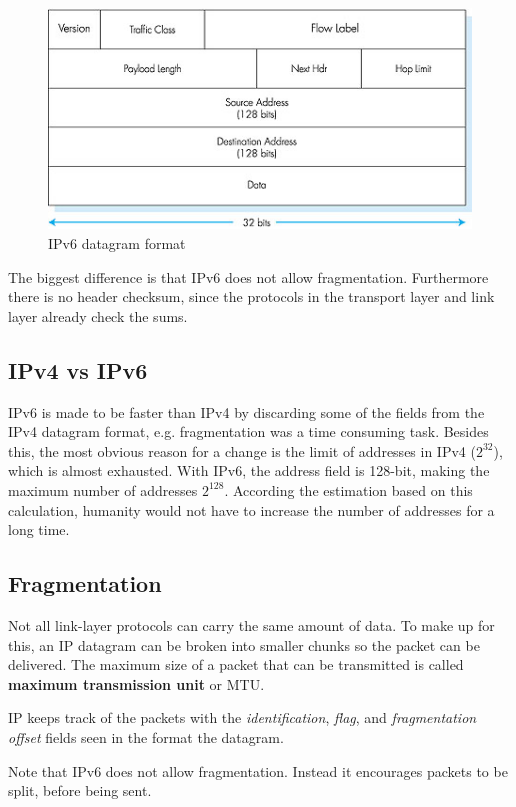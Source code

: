 \begin{figure}
  \begin{center}
    \includegraphics[scale=1]{04-40.jpg}
  \end{center}
  \caption{IPv6 datagram format}
\end{figure}

The biggest difference is that IPv6 does not allow
fragmentation. Furthermore there is no header checksum, since the
protocols in the transport layer and link layer already check the
sums.

\subsection{IPv4 vs IPv6}
IPv6 is made to be faster than IPv4 by discarding some of the fields
from the IPv4 datagram format, e.g. fragmentation was a time consuming
task. Besides this, the most obvious reason for a change is the limit
of addresses in IPv4 ($2^{32}$), which is almost exhausted. With IPv6,
the address field is 128-bit, making the maximum number of addresses
$2^{128}$. According the estimation based on this calculation,
humanity would not have to increase the number of addresses for a long time.

\subsection{Fragmentation}
Not all link-layer protocols can carry the same amount of data. To
make up for this, an IP datagram can be broken into smaller chunks so
the packet can be delivered. The maximum size of a packet that can be
transmitted is called \textbf{maximum transmission unit} or MTU.

IP keeps track of the packets with the \textit{identification},
\textit{flag}, and \textit{fragmentation offset} fields seen in the
format the datagram.

Note that IPv6 does not allow fragmentation. Instead it encourages
packets to be split, before being sent.